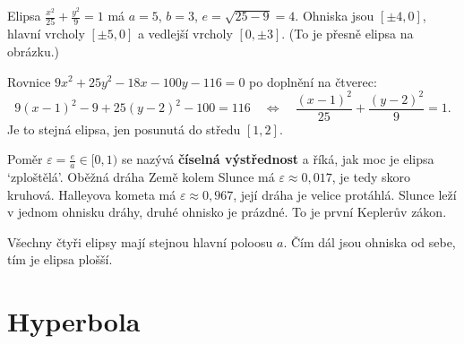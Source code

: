\begin{example}
  Elipsa $\frac{x^2}{25} + \frac{y^2}{9} = 1$ má $a = 5$, $b = 3$, $e = \sqrt{25 - 9} = 4$. Ohniska jsou $[\pm 4, 0]$, hlavní vrcholy $[\pm 5, 0]$ a vedlejší vrcholy $[0, \pm 3]$. (To je přesně elipsa na obrázku.)

  Rovnice $9x^2 + 25y^2 - 18x - 100y - 116 = 0$ po doplnění na čtverec:
  \begin{equation*}
    9{(x - 1)}^2 - 9 + 25{(y - 2)}^2 - 100 = 116\quad\Leftrightarrow\quad\frac{{(x - 1)}^2}{25} + \frac{{(y - 2)}^2}{9} = 1.
  \end{equation*}
  Je to stejná elipsa, jen posunutá do středu $[1, 2]$.
\end{example}

\begin{note}
  Poměr $\varepsilon = \frac{e}{a}\in[0, 1)$ se nazývá \textbf{číselná výstřednost} a říká, jak moc je elipsa `zploštělá'. Oběžná dráha Země kolem Slunce má $\varepsilon\approx 0{,}017$, je tedy skoro kruhová. Halleyova kometa má $\varepsilon\approx 0{,}967$, její dráha je velice protáhlá. Slunce leží v jednom ohnisku dráhy, druhé ohnisko je prázdné. To je první Keplerův zákon.
\end{note}

\begin{center}
\end{center}
Všechny čtyři elipsy mají stejnou hlavní poloosu $a$. Čím dál jsou ohniska od sebe, tím je elipsa plošší.

\section{Hyperbola}\label{sec:hyperbola}

